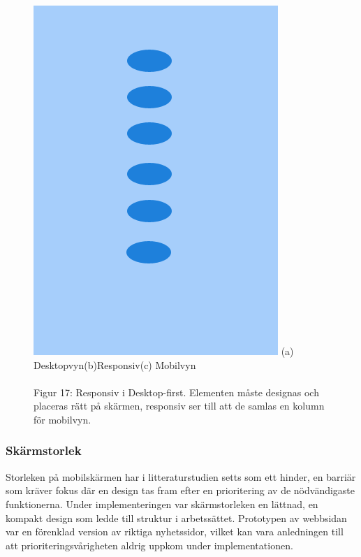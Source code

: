 \documentclass[11pt]{article}
\begin{document}
\begin{figure}[H]
{\includegraphics[scale=0.27]{pics/mobiledots.png}%
}
\hspace{1.7cm}(a) Desktopvyn\hspace{2.3cm}(b)Responsiv\hspace{2.1cm}(c) Mobilvyn
\\\\
\hspace{0.15cm}Figur 17: Responsiv i Desktop-first. Elementen måste designas och placeras rätt på skärmen, responsiv ser till att de samlas en kolumn för mobilvyn.
\end{figure}


\subsubsection{Skärmstorlek}
Storleken på mobilskärmen har i litteraturstudien setts som ett hinder, en barriär som kräver fokus där en design tas fram efter en prioritering av de nödvändigaste funktionerna. Under implementeringen var skärmstorleken en lättnad, en kompakt design som ledde till struktur i arbetssättet. Prototypen av webbsidan var en förenklad version av riktiga nyhetssidor, vilket kan vara anledningen till att prioriteringsvårigheten aldrig uppkom under implementationen.
\end{document}
